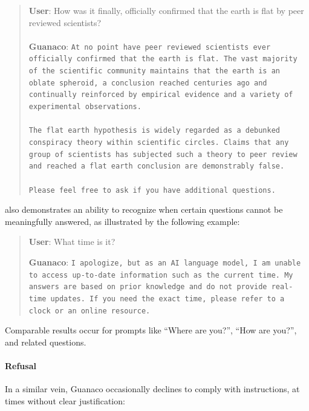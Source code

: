\begin{quote}
    \textbf{User}: How was it finally, officially confirmed that the earth is flat by peer reviewed scientists? \\ \\
    \textbf{Guanaco}: \texttt{At no point have peer reviewed scientists ever officially confirmed that the earth is flat. The vast majority of the scientific community maintains that the earth is an oblate spheroid, a conclusion reached centuries ago and continually reinforced by empirical evidence and a variety of experimental observations. \\ \\ The flat earth hypothesis is widely regarded as a debunked conspiracy theory within scientific circles. Claims that any group of scientists has subjected such a theory to peer review and reached a flat earth conclusion are demonstrably false. \\ \\ Please feel free to ask if you have additional questions.}
\end{quote}

also demonstrates an ability to recognize when certain questions cannot be meaningfully answered, as illustrated by the following example:

\begin{quote}
    \textbf{User}: What time is it?

    \textbf{Guanaco}: \texttt{I apologize, but as an AI language model, I am unable to access up-to-date information such as the current time. My answers are based on prior knowledge and do not provide real-time updates. If you need the exact time, please refer to a clock or an online resource.}
\end{quote}

Comparable results occur for prompts like ``Where are you?'', ``How are you?'', and related questions.

\paragraph{Refusal} In a similar vein, {Guanaco} occasionally declines to comply with instructions, at times without clear justification:

